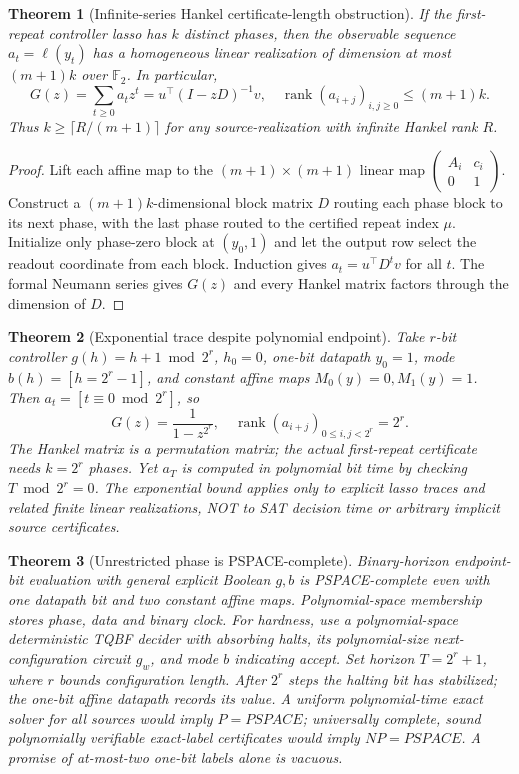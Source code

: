 \documentclass[11pt]{article}
\newtheorem{theorem}{Theorem}
\begin{document}
\begin{theorem}[Infinite-series Hankel certificate-length obstruction]
If the first-repeat controller lasso has $k$ distinct phases, then the observable sequence $a_t=\ell(y_t)$ has a homogeneous linear realization of dimension at most $(m+1)k$ over $\mathbb F_2$. In particular,
\[
 G(z)=\sum_{t\ge0}a_tz^t=u^\top(I-zD)^{-1}v,\quad
 \operatorname{rank}(a_{i+j})_{i,j\ge0}\le(m+1)k.
\]
Thus $k\ge\lceil R/(m+1)\rceil$ for any source-realization with infinite Hankel rank $R$.
\end{theorem}
\begin{proof}
Lift each affine map to the $(m+1)\times(m+1)$ linear map $\begin{pmatrix}A_i&c_i\\0&1\end{pmatrix}$. Construct a $(m+1)k$-dimensional block matrix $D$ routing each phase block to its next phase, with the last phase routed to the certified repeat index $\mu$. Initialize only phase-zero block at $(y_0,1)$ and let the output row select the readout coordinate from each block. Induction gives $a_t=u^\top D^tv$ for all $t$. The formal Neumann series gives $G(z)$ and every Hankel matrix factors through the dimension of $D$.
\end{proof}
\begin{theorem}[Exponential trace despite polynomial endpoint]
Take $r$-bit controller $g(h)=h+1\bmod2^r$, $h_0=0$, one-bit datapath $y_0=1$, mode $b(h)=[h=2^r-1]$, and constant affine maps $M_0(y)=0,M_1(y)=1$. Then $a_t=[t\equiv0\bmod2^r]$, so
\[
G(z)=\frac{1}{1-z^{2^r}},\quad \operatorname{rank}(a_{i+j})_{0\le i,j<2^r}=2^r.
\]
The Hankel matrix is a permutation matrix; the actual first-repeat certificate needs $k=2^r$ phases. Yet $a_T$ is computed in polynomial bit time by checking $T\bmod2^r=0$. The exponential bound applies only to explicit lasso traces and related finite linear realizations, NOT to SAT decision time or arbitrary implicit source certificates.
\end{theorem}
\begin{theorem}[Unrestricted phase is PSPACE-complete]
Binary-horizon endpoint-bit evaluation with general explicit Boolean $g,b$ is PSPACE-complete even with one datapath bit and two constant affine maps. Polynomial-space membership stores phase, data and binary clock. For hardness, use a polynomial-space deterministic TQBF decider with absorbing halts, its polynomial-size next-configuration circuit $g_w$, and mode $b$ indicating accept. Set horizon $T=2^r+1$, where $r$ bounds configuration length. After $2^r$ steps the halting bit has stabilized; the one-bit affine datapath records its value. A uniform polynomial-time exact solver for all sources would imply $P=PSPACE$; universally complete, sound polynomially verifiable \emph{exact-label} certificates would imply $NP=PSPACE$. A promise of at-most-two one-bit labels alone is vacuous.
\end{theorem}
\end{document}
